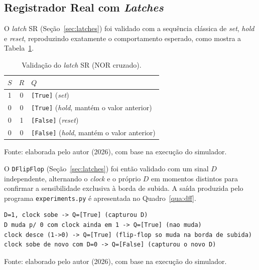 \subsection{Registrador Real com \textit{Latches}}
\label{sec:contador-portas-real}

O \textit{latch} SR (Seção~\ref{sec:latches}) foi validado com a sequência clássica de \textit{set}, \textit{hold} e \textit{reset}, reproduzindo exatamente o comportamento esperado, como mostra a Tabela~\ref{tab:sr-latch}.

\begin{table}[H]
\centering
\caption{Validação do \textit{latch} SR (NOR cruzado).}
\label{tab:sr-latch}
\begin{tabular}{cc|l}
\hline
$S$ & $R$ & $Q$ \\
\hline
1 & 0 & \texttt{[True]} (\textit{set}) \\
0 & 0 & \texttt{[True]} (\textit{hold}, mantém o valor anterior) \\
0 & 1 & \texttt{[False]} (\textit{reset}) \\
0 & 0 & \texttt{[False]} (\textit{hold}, mantém o valor anterior) \\
\hline
\end{tabular}
\begin{center}
\footnotesize Fonte: elaborada pelo autor (2026), com base na execução do simulador.
\end{center}
\end{table}

O \texttt{DFlipFlop} (Seção~\ref{sec:latches}) foi então validado com um sinal $D$ independente, alternando o \textit{clock} e o próprio $D$ em momentos distintos para confirmar a sensibilidade exclusiva à borda de subida. A saída produzida pelo programa \texttt{experiments.py} é apresentada no Quadro~\ref{qua:dff}.

\begin{quadro}[H]
\centering
\caption{Validação do \texttt{DFlipFlop} isolado.}
\label{qua:dff}
\begin{minipage}{0.9\textwidth}
\begin{verbatim}
D=1, clock sobe -> Q=[True] (capturou D)
D muda p/ 0 com clock ainda em 1 -> Q=[True] (nao muda)
clock desce (1->0) -> Q=[True] (flip-flop so muda na borda de subida)
clock sobe de novo com D=0 -> Q=[False] (capturou o novo D)
\end{verbatim}
\end{minipage}
\begin{center}
\footnotesize Fonte: elaborado pelo autor (2026), com base na execução do simulador.
\end{center}
\end{quadro}

